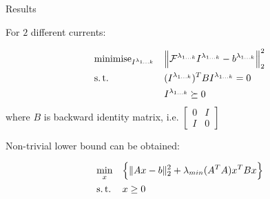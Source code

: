 \documentclass[../main.tex]{subfiles}
\begin{document}
%
%



\begin{frame}[t]{Results}

For $2$ different currents:

\begin{equation*}
\begin{aligned}
& \operatorname{minimise}_{I^{\lambda_{1\ldots k}}} 
& & \Big\| \mathcal{F}^{\lambda_{1 \ldots k}} I^{\lambda_{1\ldots k}} - b^{\lambda_{1 \ldots k}} \Big\|_2^2 \\
& \operatorname{s.t.}
& & (I^{\lambda_{1\ldots k}})^T B I^{\lambda_{1\ldots k}} = 0 \\
&&& I^{\lambda_{1\ldots k}} \succeq 0 \\
\end{aligned}
\end{equation*}
where $B$ is backward identity matrix, i.e. $\begin{bmatrix} 0 & I \\ I & 0\end{bmatrix}$


Non-trivial lower bound can be obtained:

\begin{equation*}
\begin{aligned}
& \min_{x} 
& & \Big\{\| Ax - b \|_2^2 + \lambda_{min} (A^TA) x^T B x \Big\} \\
& \operatorname{s.t.}
& & x \ge 0 \\
\end{aligned}
\end{equation*}

\end{frame}





%
%
\end{document}
